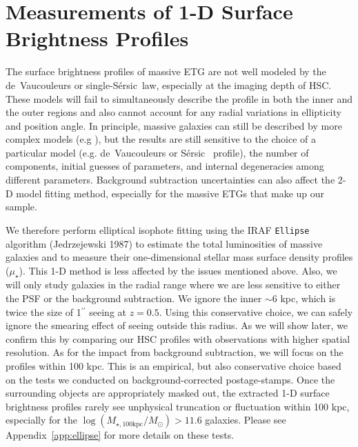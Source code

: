 \documentclass[a4paper,fleqn,usenatbib]{mnras}
\def\asec{$^{\prime\prime}$}
\def\ser{{S\'{e}rsic\ }}
\def\logmtot{{$\log (M_{\star,100\mathrm{kpc}}/M_{\odot})$}}
\def\mden{{$\mu_{\star}$}}
\begin{document}
\section{Measurements of 1-D Surface Brightness Profiles}
    \label{sec:ellipse}
    
    The surface brightness profiles of massive ETG are not well modeled by the 
    de~Vaucouleurs or single-\ser law, especially at the imaging depth of HSC.
    These models will fail to simultaneously describe the profile in both the inner 
    and the outer regions and also cannot account for any radial variations in 
    ellipticity and position angle. 
    In principle, massive galaxies can still be described by more complex 
    models (e.g \citealt{Huang2013a, Huang2013b, Oh2017}), but the results are still 
    sensitive to the choice of a particular model (e.g. de~Vaucouleurs or \ser{} 
    profile), the number of components, initial guesses of parameters, and internal 
    degeneracies among different parameters. 
    Background subtraction uncertainties can also affect the 2-D model fitting method, 
    especially for the massive ETGs that make up our sample. 
    
    We therefore perform elliptical isophote fitting using the IRAF \texttt{Ellipse} 
    algorithm (Jedrzejewski 1987) to estimate the total luminosities of massive 
    galaxies and to measure their one-dimensional stellar mass surface 
    density profiles (\mden{}). 
    This 1-D method is less affected by the issues mentioned above. 
    Also, we will only study galaxies in the radial range where we are less 
    sensitive to either the PSF or the background subtraction.
    We ignore the inner $\sim6$ kpc, which is twice the size of 1\asec{} seeing at 
    $z=0.5$.
    Using this conservative choice, we can safely ignore the smearing effect of 
    seeing outside this radius.
    As we will show later, we confirm this by comparing our HSC profiles with 
    observations with higher spatial resolution. 
    As for the impact from background subtraction, we will focus on the profiles 
    within 100 kpc. 
    This is an empirical, but also conservative choice based on the tests we 
    conducted on background-corrected postage-stamps. 
    Once the surrounding objects are appropriately masked out, the extracted 1-D 
    surface brightness profiles rarely see unphysical truncation or fluctuation 
    within 100 kpc, especially for the \logmtot{}$>11.6$ galaxies. 
    Please see Appendix~\ref{app:ellipse} for more details on these tests.
        
\end{document}
